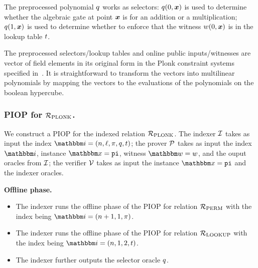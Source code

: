 \begin{remark}
    The preprocessed polynomial $q$ works as selectors: $q(0, \boldsymbol{x})$ is used 
    to determine whether the algebraic gate at point $\boldsymbol{x}$ is for an addition or a multiplication;
    $q(1, \boldsymbol{x})$ is used to determine whether to enforce that the witness $w(0, \boldsymbol{x})$ is in
    the lookup table $t$.
\end{remark}

\begin{remark}[Arithmetization]
    The preprocessed selectors/lookup tables and online public inputs/witnesses are vector
    of field elements in its original form in the Plonk constraint systems specified in~\cite{GWC19}.
    It is straightforward to transform the vectors into multilinear polynomials by mapping the 
    vectors to the evaluations of the polynomials on the boolean hypercube. 
\end{remark}

\subsubsection*{PIOP for ${\mathcal{R}}_{\text{PLONK}}$.}
We construct a PIOP for the indexed relation ${\mathcal{R}}_{\text{PLONK}}$.
The indexer $\mathcal{I}$ takes as input the index $\idxR = (n, \ell, \perm, \sel, \tabp)$;
the prover $\mathcal{P}$ takes as input the index $\idxR$, instance $\instR = \pubinp$,
witness $\witR = \witp$, and the ouput oracles from $\mathcal{I}$;
the verifier $\mathcal{V}$ takes as input the instance $\instR = \pubinp$ and 
the indexer oracles.


\textbf{Offline phase.}
\begin{itemize}
    \item The indexer runs the offline phase of the PIOP for relation ${\mathcal{R}}_{\text{PERM}}$ with 
        the index being $\idxR = (n+1, 1, \perm)$.
    \item The indexer runs the offline phase of the PIOP for relation ${\mathcal{R}}_{\text{LOOKUP}}$ with
        the index being $\idxR = (n, 1, 2, \tabp)$.
    \item The indexer further outputs the selector oracle $q$.
\end{itemize}


